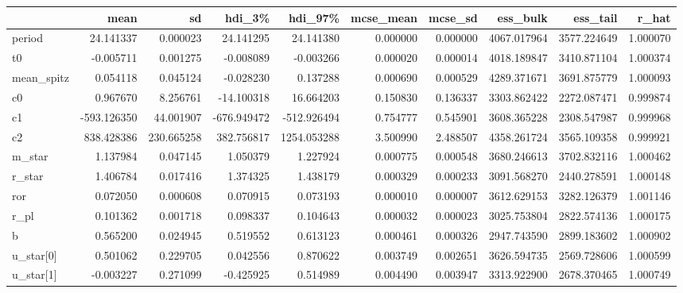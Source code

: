 \begin{tabular}{lrrrrrrrrr}
\toprule
{} &        mean &          sd &      hdi\_3\% &      hdi\_97\% &  mcse\_mean &   mcse\_sd &     ess\_bulk &     ess\_tail &     r\_hat \\
\midrule
period        &   24.141337 &    0.000023 &   24.141295 &    24.141380 &   0.000000 &  0.000000 &  4067.017964 &  3577.224649 &  1.000070 \\
t0            &   -0.005711 &    0.001275 &   -0.008089 &    -0.003266 &   0.000020 &  0.000014 &  4018.189847 &  3410.871104 &  1.000374 \\
mean\_spitz    &    0.054118 &    0.045124 &   -0.028230 &     0.137288 &   0.000690 &  0.000529 &  4289.371671 &  3691.875779 &  1.000093 \\
c0            &    0.967670 &    8.256761 &  -14.100318 &    16.664203 &   0.150830 &  0.136337 &  3303.862422 &  2272.087471 &  0.999874 \\
c1            & -593.126350 &   44.001907 & -676.949472 &  -512.926494 &   0.754777 &  0.545901 &  3608.365228 &  2308.547987 &  0.999968 \\
c2            &  838.428386 &  230.665258 &  382.756817 &  1254.053288 &   3.500990 &  2.488507 &  4358.261724 &  3565.109358 &  0.999921 \\
m\_star        &    1.137984 &    0.047145 &    1.050379 &     1.227924 &   0.000775 &  0.000548 &  3680.246613 &  3702.832116 &  1.000462 \\
r\_star        &    1.406784 &    0.017416 &    1.374325 &     1.438179 &   0.000329 &  0.000233 &  3091.568270 &  2440.278591 &  1.000148 \\
ror           &    0.072050 &    0.000608 &    0.070915 &     0.073193 &   0.000010 &  0.000007 &  3612.629153 &  3282.126379 &  1.001146 \\
r\_pl          &    0.101362 &    0.001718 &    0.098337 &     0.104643 &   0.000032 &  0.000023 &  3025.753804 &  2822.574136 &  1.000175 \\
b             &    0.565200 &    0.024945 &    0.519552 &     0.613123 &   0.000461 &  0.000326 &  2947.743590 &  2899.183602 &  1.000902 \\
u\_star[0]     &    0.501062 &    0.229705 &    0.042556 &     0.870622 &   0.003749 &  0.002651 &  3626.594735 &  2569.728606 &  1.000599 \\
u\_star[1]     &   -0.003227 &    0.271099 &   -0.425925 &     0.514989 &   0.004490 &  0.003947 &  3313.922900 &  2678.370465 &  1.000749 \\

\end{tabular}
